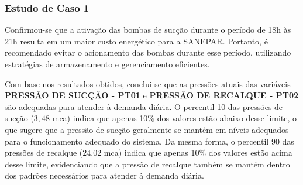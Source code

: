 %

%
%

\subsubsection{Estudo de Caso 1}\label{subsubsec:quest-est}


Confirmou-se que a ativação das bombas de sucção durante o período de 18h às 21h resulta em um maior custo energético para a SANEPAR. Portanto, é recomendado evitar o acionamento das bombas durante esse período, utilizando estratégias de armazenamento e gerenciamento eficientes.




Com base nos resultados obtidos, conclui-se que as pressões atuais das variáveis \textbf{PRESSÃO DE SUCÇÃO - PT01} e \textbf{PRESSÃO DE RECALQUE - PT02} são adequadas para atender à demanda diária. O percentil 10 das pressões de sucção ($3,48$ mca) indica que apenas 10\% dos valores estão abaixo desse limite, o que sugere que a pressão de sucção geralmente se mantém em níveis adequados para o funcionamento adequado do sistema. Da mesma forma, o percentil 90 das pressões de recalque ($24.02$ mca) indica que apenas 10\% dos valores estão acima desse limite, evidenciando que a pressão de recalque também se mantém dentro dos padrões necessários para atender à demanda diária.

